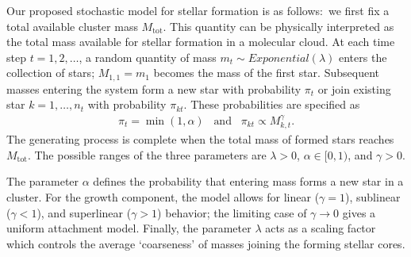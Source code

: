 \documentclass[12pt]{article}
\newcommand{\Mtot}{M_{\text{tot}}}
\begin{document}
Our proposed stochastic model for stellar formation is as follows:~we first fix a total available cluster mass $\Mtot$. 
This quantity can be physically interpreted as the total mass available for stellar formation in a molecular cloud. 
At each time step $t = 1, 2, \ldots$, a random quantity of mass $m_t \sim Exponential(\lambda)$ enters the collection of stars; $M_{1,1} = m_1$ becomes the mass of the first star.
Subsequent masses entering the system form a new star with probability $\pi_t$ or join existing star $k = 1, \ldots, n_t$ with probability $\pi_{kt}$.
These probabilities are specified as
\begin{align}
	\pi_t = \min \left (1, \alpha \right ) \;\;\; \text{and} \;\;\; \pi_{kt} \propto M_{k,t}^{\gamma}\text{.}
\label{eq:PAstars}
\end{align}
The generating process is complete when the total mass of formed stars reaches $\Mtot$. 
The possible ranges of the three parameters are $\lambda > 0$, $\alpha \in [0,1)$, and $\gamma > 0$. 

The parameter $\alpha$ defines the probability that entering mass forms a new star in a cluster.  For the growth component, the model allows for linear ($\gamma = 1$), sublinear ($\gamma < 1$), and superlinear ($\gamma > 1$) behavior; the limiting case of $\gamma \to 0$ gives a uniform attachment model.  Finally, the parameter $\lambda$ acts as a scaling factor which controls the average `coarseness' of masses joining the forming stellar cores. 
\end{document}
